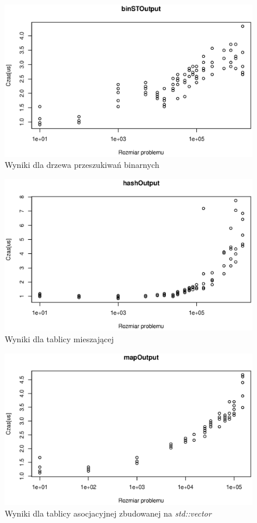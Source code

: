 \documentclass[10pt,a4paper]{article}
\begin{document}
\begin{figure}[H]
\centering
\includegraphics[width=0.7\linewidth]{./Wykresy/binSTOutput}
\caption{Wyniki dla drzewa przeszukiwań binarnych}
\label{fig:binSTOutput}
\end{figure}


\begin{figure}[H]
\centering
\includegraphics[width=0.7\linewidth]{./Wykresy/hashOutput}
\caption{Wyniki dla tablicy mieszającej}
\label{fig:hashOutput}
\end{figure}

\begin{figure}[H]
\centering
\includegraphics[width=0.7\linewidth]{./Wykresy/mapOutput}
\caption{Wyniki dla tablicy asocjacyjnej zbudowanej na \textit{std::vector}}
\label{fig:mapOutput}
\end{figure}
\end{document}
